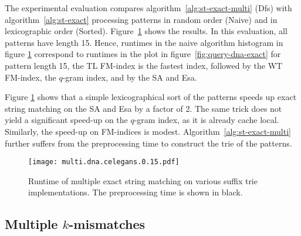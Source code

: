 The experimental evaluation compares algorithm~\ref{alg:st-exact-multi} (Dfs) with algorithm~\ref{alg:st-exact} processing patterns in random order (Naive) and in lexicographic order (Sorted).
Figure~\ref{fig:query-dna-exact-multi} shows the results.
In this evaluation, all patterns have length 15.
Hence, runtimes in the naive algorithm histogram in figure \ref{fig:query-dna-exact-multi} correspond to runtimes in the plot in figure~\ref{fig:query-dna-exact} for pattern length 15, \ie the TL FM-index is the fastest index, followed by the WT FM-index, the $q$-gram index, and by the SA and Esa.

Figure \ref{fig:query-dna-exact-multi} shows that a simple lexicographical sort of the patterns speeds up exact string matching on the SA and Esa by a factor of 2.
The same trick does not yield a significant speed-up on the $q$-gram index, as it is already cache local.
Similarly, the speed-up on FM-indices is modest.
Algorithm~\ref{alg:st-exact-multi} further suffers from the preprocessing time to construct the trie of the patterns.


\begin{figure}[t]
\begin{center}
\caption[Multiple exact string matching runtime]{Runtime of multiple exact string matching on various suffix trie implementations. The preprocessing time is shown in black.}
\label{fig:query-dna-exact-multi}
\texttt{[image: multi.dna.celegans.0.15.pdf]}
\end{center}
\end{figure}

\subsection{Multiple $k$-mismatches}
\label{sec:index:algo:multimismatch}

